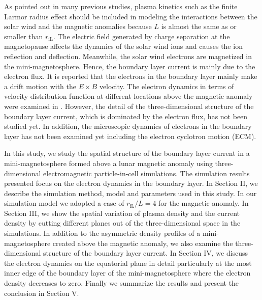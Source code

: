 \documentclass[draft,jgrga]{agutex2015}
\begin{document}
\begin{article}
As pointed out in many previous studies,
plasma kinetics such as the finite Larmor radius effect should be included in modeling
the interactions between the solar wind and the magnetic anomalies
because $L$ is almost the same as or smaller than $r_\mathrm{iL}$.
The electric field generated by
charge separation at the magnetopause affects 
the dynamics of the solar wind ions and 
causes the ion reflection and deflection. %
Meanwhile, the solar wind electrons are magnetized in the mini-magnetosphere.
Hence, the boundary layer current is mainly due to the electron flux.
It is reported that the electrons in the boundary layer 
mainly make a drift motion with the $E \times B$ velocity.
The electron dynamics in terms of velocity distribution function at different locations above
the magnetic anomaly were examined in \cite{Deca2015}.
However, the detail of the three-dimensional structure of the boundary layer current,
which is  dominated by the electron flux, has not been studied yet.
In addition, 
the microscopic dynamics of electrons in the boundary layer has not been
examined yet including the electron cyclotron motion (ECM).
%

In this study,
we study the spatial structure of the boundary layer current 
in a mini-magnetosphere formed above a lunar magnetic anomaly
using  three-dimensional electromagnetic particle-in-cell simulations.
The simulation results presented focus on the electron dynamics in the boundary layer.
In Section II, we describe the simulation method, model and parameters used in this study.
In our simulation model we adopted a case of $r_\mathrm{iL} /L=4$ for the magnetic anomaly.
In Section III, we show the spatial variation of plasma density and the current density
by cutting different planes out of the three-dimensional space in the simulations.
In addition to the asymmetric density profiles of a mini-magnetosphere created above
the magnetic anomaly, 
we also examine the three-dimensional structure of the boundary layer current.
In Section IV, we discuss the electron dynamics on the equatorial plane in detail
particularly at the most inner edge of the boundary layer of the mini-magnetosphere 
where the electron density decreases to zero.
Finally we summarize the results and present the conclusion in Section V.



\end{article}
\end{document}
